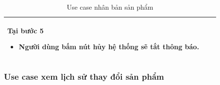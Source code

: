 \documentclass[12pt,a4paper]{article}
\begin{document}
\begin{table}[H]
\begin{tabular}{|p{3.5cm}|p{11.5cm}|c|}
            Tại bước 5\newline
            \vspace{-.8cm}\begin{itemize}
                              \item Người dùng bấm nút hủy hệ thống sẽ tắt thông báo.
            \end{itemize} \\
            \hline
        \end{tabular}
        \caption{Use case nhân bản sản phẩm }

    \end{table}


    \subsubsection*{Use case xem lịch sử thay đổi sản phẩm}
\end{document}
